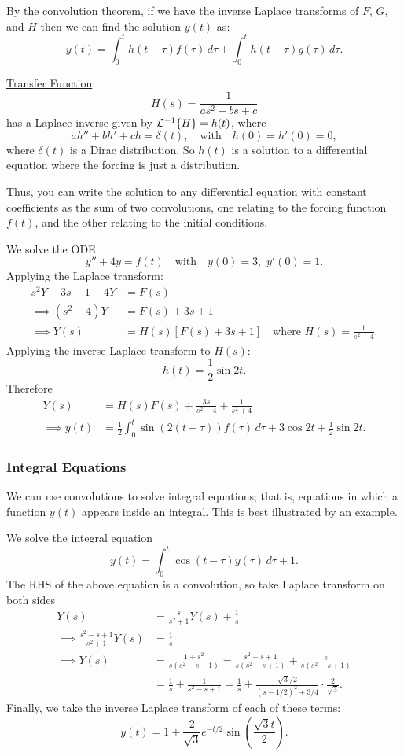 By the convolution theorem, if we have the inverse Laplace transforms of $F$, $G$, and $H$ then we can find the solution $y(t)$ as:
\[
y(t) = \int_0^t h(t-\tau)f(\tau) \,d\tau + \int_0^t h(t-\tau)g(\tau)\,d\tau.
\]

\underline{Transfer Function}:
\[
H(s) = \frac{1}{as^2+bs+c}
\]
has a Laplace inverse given by $\mathcal{L}^{-1}\{H\} = h(t)$, where 
\[
ah'' + bh' + ch = \delta(t), \quad\text{with}\quad h(0) = h'(0) = 0,
\]
where $\delta(t)$ is a Dirac distribution. So $h(t)$ is a solution to a differential equation where the forcing is just a distribution.

Thus, you can write the solution to any differential equation with constant coefficients as the sum of two convolutions, one relating to the forcing function $f(t)$, and the other relating to the initial conditions.

\begin{eg}
	We solve the ODE
	\[
	y''+4y = f(t) \quad\text{with}\quad y(0) = 3, \,\, y'(0) = 1.
	\]
	Applying the Laplace transform:
	\begin{align*}
		s^2Y - 3s - 1 + 4Y &= F(s) \\
		\implies (s^2+4)Y &= F(s)+3s+1 \\
		\implies Y(s) &= H(s) \left[ F(s) + 3s+1\right] \quad \text{where } H(s) = \frac{1}{s^2+4}.
	\end{align*}
	Applying the inverse Laplace transform to $H(s)$:
	\[
	h(t) = \frac12 \sin{2t}.
	\]
	Therefore
	\begin{align*}
		Y(s) &= H(s)F(s) + \frac{3s}{s^2+4} + \frac{1}{s^2+4} \\
		\implies y(t) &= \frac12 \int_0^t \sin\left(2(t-\tau)\right) f(\tau) \,d\tau + 3\cos{2t} + \frac12\sin{2t}.
	\end{align*}
\end{eg}

\subsubsection{Integral Equations}

We can use convolutions to solve integral equations; that is, equations in which a function $y(t)$ appears inside an integral. This is best illustrated by an example.

\begin{eg}
	We solve the integral equation
	\[
	y(t) = \int_0^t \cos{(t-\tau)}y(\tau)\,d\tau + 1.
	\]
	The RHS of the above equation is a convolution, so take Laplace transform on both sides 
	\begin{align*}
		Y(s) &= \frac{s}{s^2+1}Y(s) + \frac1s \\
		\implies \frac{s^2-s+1}{s^2+1}Y(s) &= \frac1s \\
		\implies Y(s) &= \frac{1+s^2}{s(s^2-s+1)} = \frac{s^2-s+1}{s(s^2-s+1)} + \frac{s}{s(s^2-s+1)} \\
		&= \frac1s + \frac{1}{s^2-s+1} = \frac1s + \frac{\sqrt{3}/2}{\left(s-1/2\right)^2 + 3/4} \cdot \frac{2}{\sqrt{3}}.
	\end{align*}
	Finally, we take the inverse Laplace transform of each of these terms:
	\[
	y(t) = 1 + \frac{2}{\sqrt{3}}e^{-t/2} \sin{\left(\frac{\sqrt{3}t}{2}\right)}.
	\]
\end{eg}

